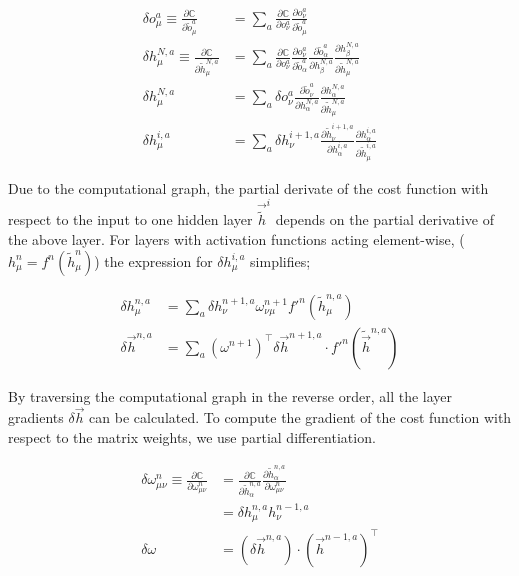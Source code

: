\documentclass[../dissertation.tex]{subfiles}
\begin{document}
\begin{align}
    \delta o^a_\mu \equiv \frac{\partial \mathbb{C}}{\partial \tilde{o}^a_\mu} & = 
        \sum_a
        \frac{\partial \mathbb{C}}{\partial o^a_\nu}
        \frac{\partial o^a_\nu}{\partial \tilde{o}^a_\mu} \\
    \delta h^{N,a}_\mu \equiv \frac{\partial \mathbb{C}}{\partial \tilde{h}^{N,a}_\mu} & = 
        \sum_a
        \frac{\partial \mathbb{C}}{\partial o^a_\nu}
        \frac{\partial o^a_\nu}{\partial \tilde{o}^a_\alpha}
        \frac{\partial \tilde{o}^a_\alpha}{\partial h^{N,a}_\beta}
        \frac{\partial h^{N,a}_\beta}{\partial \tilde{h}^{N,a}_\mu} \\
    \delta h^{N,a}_\mu & =
        \sum_a
        \delta o^a_\nu
        \frac{\partial \tilde{o}^a_\nu}{\partial h^{N,a}_\alpha}
        \frac{\partial h^{N,a}_\alpha}{\partial \tilde{h}^{N,a}_\mu} \\
    \delta h^{i,a}_\mu & =
        \sum_a
        \delta h^{i + 1,a}_\nu
        \frac{\partial \tilde{h}^{i+1,a}_\nu}{\partial h^{i,a}_\alpha}
        \frac{\partial h^{i,a}_\alpha}{\partial \tilde{h}^{i,a}_\mu}
\end{align}

Due to the computational graph, the partial derivate of the cost function with respect to the input to one hidden layer $\vec{\tilde{h}}^i$ depends on the partial derivative of the above layer.
For layers with activation functions acting element-wise, ($h^n_\mu = f^n(\tilde{h}^n_\mu)$) the expression for $\delta h^{i,a}_\mu$ simplifies;

\begin{align}
    \label{eqn:ff-bp-layerDelta}
    \delta h^{n,a}_\mu & =
        \sum_a
        \delta h^{n + 1,a}_\nu
        \omega^{n + 1}_{\nu\mu}
        f'^n(\tilde{h}^{n,a}_\mu) \\
    \delta \vec{h}^{n, a} & = 
        \sum_a
        \left( \omega^{ n + 1} \right)^\intercal
        \delta \vec{h}^{n+1, a}
        \cdot f'^n (\tilde{\vec{h}}^{n,a})
\end{align}

By traversing the computational graph in the reverse order, all the layer gradients $\delta \vec{h}$ can be calculated.
To compute the gradient of the cost function with respect to the matrix weights, we use partial differentiation.

\begin{align}
    \delta \omega^{n}_{\mu \nu} \equiv \frac{\partial \mathbb{C}}{\partial \omega^{n}_{\mu \nu}} & =
        \frac{\partial \mathbb{C}}{\partial \tilde{h}^{n,a}_\alpha}
        \frac{\partial \tilde{h}^{n,a}_\alpha}{\partial \omega^{n}_{\mu \nu}} \\
    & =
    \delta h^{n,a}_\mu
    h^{n - 1,a}_\nu \\
    \delta \omega &= 
        \left( \delta \vec{h}^{n, a} \right) \cdot \left( \vec{h}^{n - 1, a} \right)^\intercal
\end{align}
\end{document}
